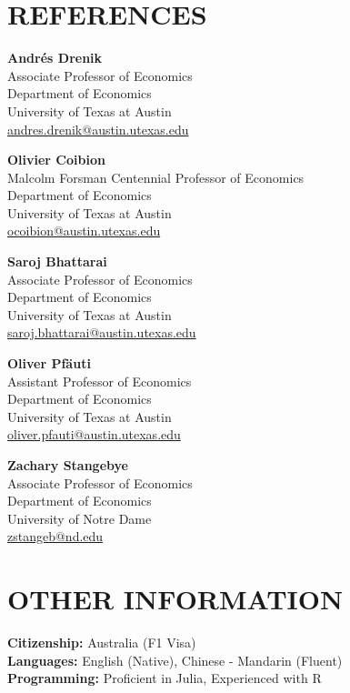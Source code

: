 \documentclass[letterpaper,11pt]{article}
\begin{document}
\section{\textbf{REFERENCES}}
\begin{minipage}[t]{0.48\columnwidth}
\textbf{Andrés Drenik} \\
Associate Professor of Economics \\
Department of Economics \\
University of Texas at Austin \\
\href{andres.drenik@austin.utexas.edu}{andres.drenik@austin.utexas.edu}
\end{minipage}%
\hfill
\begin{minipage}[t]{0.48\columnwidth}
\textbf{Olivier Coibion} \\
Malcolm Forsman Centennial Professor of Economics \\
Department of Economics \\
University of Texas at Austin \\
\href{ocoibion@austin.utexas.edu}{ocoibion@austin.utexas.edu}
\end{minipage}

\vspace{1em}

\noindent
\begin{minipage}[t]{0.48\columnwidth}
\textbf{Saroj Bhattarai} \\
Associate Professor of Economics \\
Department of Economics \\
University of Texas at Austin \\
\href{saroj.bhattarai@austin.utexas.edu}{saroj.bhattarai@austin.utexas.edu}
\end{minipage}%
\hfill
\begin{minipage}[t]{0.48\columnwidth}
\textbf{Oliver Pf\"{a}uti} \\
Assistant Professor of Economics \\
Department of Economics \\
University of Texas at Austin \\
\href{oliver.pfauti@austin.utexas.edu}{oliver.pfauti@austin.utexas.edu}
\end{minipage}

\vspace{1em}

\noindent
\begin{minipage}[t]{0.48\columnwidth}
\textbf{Zachary Stangebye} \\
Associate Professor of Economics \\
Department of Economics \\
University of Notre Dame \\
\href{zstangeb@nd.edu}{zstangeb@nd.edu}
\end{minipage}

\section{\textbf{OTHER INFORMATION}}
\textbf{Citizenship:} Australia (F1 Visa)\\
\textbf{Languages:} English (Native), Chinese - Mandarin (Fluent)\\
\textbf{Programming:} Proficient in Julia, Experienced with R\\
\vspace{1cm}
 
\end{document}

